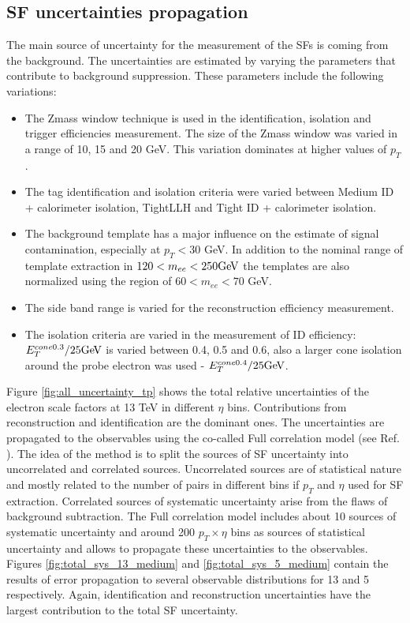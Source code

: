     
    \subsection{SF uncertainties propagation}
    The main source of uncertainty for the measurement of the SFs is coming from the background. The uncertainties are estimated by varying the parameters that contribute to background suppression. These parameters include the following variations:
    \begin{itemize}
    	\item The Zmass window technique is used in the identification, isolation and trigger efficiencies measurement. The size of the Zmass window was varied in a range of 10, 15 and 20 GeV. This variation dominates at higher values of $p_T$.
    	\item The tag identification and isolation criteria were varied between Medium ID + calorimeter isolation, TightLLH and Tight ID + calorimeter isolation.
    	\item The background template has a major influence on the estimate of signal contamination, especially at $p_T<30$ GeV. In addition to the nominal range of template extraction in $120 < m_{ee} < 250\text{Ge\kern -0.1em V}$ the templates are also normalized using the region of $60 < m_{ee} < 70$ GeV.
    	\item The side band range is varied for the reconstruction efficiency measurement. 
    	\item The isolation criteria are varied in the measurement of ID efficiency: $E_T^{cone0.3}/25\text{Ge\kern -0.1em V}$ is varied between 0.4, 0.5 and 0.6, also a larger cone isolation around the probe electron was used - $E_T^{cone0.4}/25\text{Ge\kern -0.1em V}$.
    \end{itemize}
    
    Figure \ref{fig:all_uncertainty_tp} shows the total relative uncertainties of the electron scale factors at 13 TeV in different $\eta$ bins. Contributions from reconstruction and identification are the dominant ones. The uncertainties are propagated to the observables using the co-called Full correlation model (see Ref. \cite{topoclust_2019}). The idea of the method is to split the sources of SF uncertainty into uncorrelated and correlated sources. Uncorrelated sources are of statistical nature and mostly related to the number of \Zee pairs in different bins if $p_T$ and $\eta$ used for SF extraction. Correlated sources of systematic uncertainty arise from the flaws of background subtraction. The Full correlation model includes about 10 sources of systematic uncertainty and around 200 $p_T\times\eta$ bins as sources of statistical uncertainty and allows to propagate these uncertainties to the observables. Figures \ref{fig:total_sys_13_medium} and \ref{fig:total_sys_5_medium} contain the results of error propagation to several observable distributions for 13 and 5 \tev{} respectively. Again, identification and reconstruction uncertainties have the largest contribution to the total SF uncertainty. 
    
